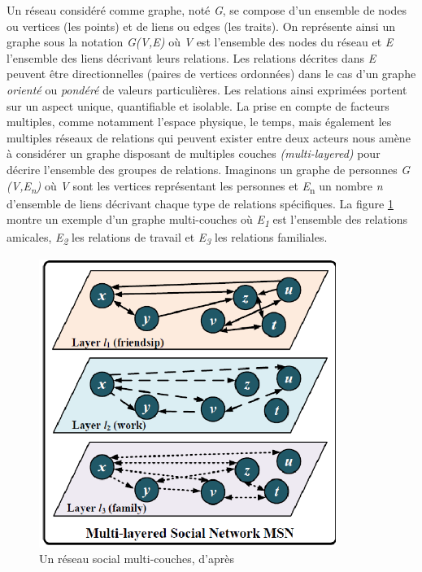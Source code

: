 Un réseau considéré comme graphe, noté \textit{G}, se compose d{\textquoteright}un ensemble de nodes ou vertices (les points) et de liens ou edges (les traits). On représente ainsi un graphe sous la notation \textit{G(V,E)} o\`u \textit{V }est l{\textquoteright}ensemble des nodes du réseau et \textit{E} l{\textquoteright}ensemble des liens\textit{ }décrivant leurs relations. Les relations décrites dans \textit{E} peuvent \^etre directionnelles (paires de vertices ordonnées) dans le cas d{\textquoteright}un graphe \textit{orienté }ou \textit{pondéré} de valeurs particulières. Les relations ainsi exprimées portent sur un aspect unique, quantifiable et isolable. La prise en compte de facteurs multiples, comme notamment l{\textquoteright}espace physique, le temps, mais également les multiples réseaux de relations qui peuvent exister entre deux acteurs nous amène à considérer un graphe disposant de multiples couches \textit{(}\textit{multi-layered)} pour décrire l{\textquoteright}ensemble des groupes de relations. Imaginons un graphe de personnes \textit{G (V,E}\textit{\textsubscript{n}}\textit{)} o\`u \textit{V }sont les vertices représentant les personnes et \textit{E}\textsubscript{n} un nombre \textit{n }d{\textquoteright}ensemble de liens\textit{ }décrivant chaque type de relations spécifiques. La figure \ref{fig:multi-layer} montre un exemple d{\textquoteright}un graphe multi-couches o\`u \textit{E}\textit{\textsubscript{1}} est l{\textquoteright}ensemble des relations amicales, \textit{E}\textit{\textsubscript{2}}\textsubscript{ }les relations de travail et \textit{E}\textit{\textsubscript{3}}\textsubscript{ }les relations familiales.

\begin{figure}
    \centering
    \includegraphics[width=3.8004in,height=3.6894in]{figures/chap3/chapitre3-img3.png}
    \caption [réseau social multi-couches] {Un réseau social multi-couches, d{\textquoteright}après \cite{Brodka2013}}
    \label{fig:multi-layer}
\end{figure}

